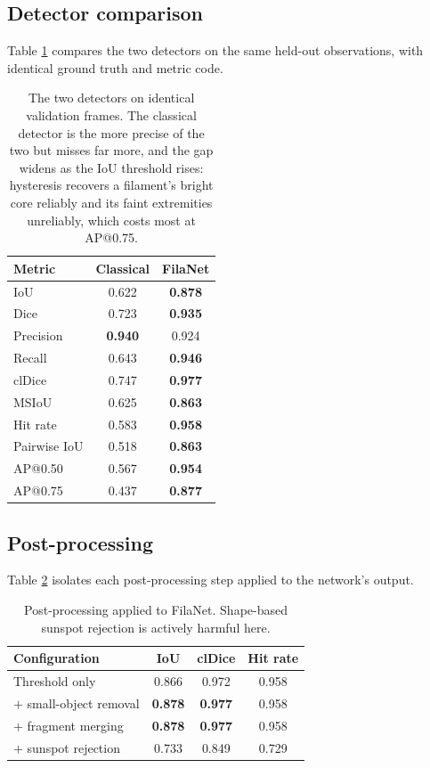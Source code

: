 \documentclass[11pt]{article}
\begin{document}
\subsection{Detector comparison}

Table \ref{tab:headtohead} compares the two detectors on the same held-out
observations, with identical ground truth and metric code.

\begin{table}[h]
\begin{center}
\begin{tabular}{lcc}
\toprule
Metric & Classical & FilaNet \\
\midrule
IoU & 0.622 & \textbf{0.878} \\
Dice & 0.723 & \textbf{0.935} \\
Precision & \textbf{0.940} & 0.924 \\
Recall & 0.643 & \textbf{0.946} \\
clDice & 0.747 & \textbf{0.977} \\
MSIoU & 0.625 & \textbf{0.863} \\
Hit rate & 0.583 & \textbf{0.958} \\
Pairwise IoU & 0.518 & \textbf{0.863} \\
AP@0.50 & 0.567 & \textbf{0.954} \\
AP@0.75 & 0.437 & \textbf{0.877} \\
\bottomrule
\end{tabular}
\caption{The two detectors on identical validation frames. The classical
detector is the more precise of the two but misses far more, and the gap widens
as the IoU threshold rises: hysteresis recovers a filament's bright core
reliably and its faint extremities unreliably, which costs most at
AP@0.75.}\label{tab:headtohead}
\end{center}
\end{table}

\subsection{Post-processing}

Table \ref{tab:postproc} isolates each post-processing step applied to the
network's output.

\begin{table}[h]
\begin{center}
\begin{tabular}{lccc}
\toprule
Configuration & IoU & clDice & Hit rate \\
\midrule
Threshold only & 0.866 & 0.972 & 0.958 \\
$+$ small-object removal & \textbf{0.878} & \textbf{0.977} & 0.958 \\
$+$ fragment merging & \textbf{0.878} & \textbf{0.977} & 0.958 \\
$+$ sunspot rejection & 0.733 & 0.849 & 0.729 \\
\bottomrule
\end{tabular}
\caption{Post-processing applied to FilaNet. Shape-based sunspot rejection is
actively harmful here.}\label{tab:postproc}
\end{center}
\end{table}
\end{document}
